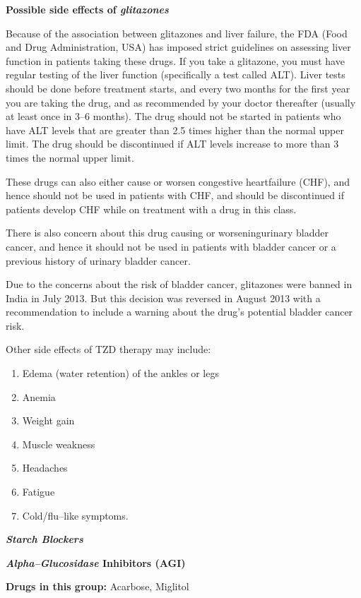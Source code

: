 \noindent\textbf{Possible side effects of \textit{glitazones}}

Because of the association between glitazones and liver failure, the FDA (Food and Drug Administration, USA) has imposed strict guidelines on assessing liver function in patients taking these drugs. If you take a glitazone, you must have regular testing of the liver function (specifically a test called ALT). Liver tests should be done before treatment starts, and every two months for the first year you are taking the drug, and as recommended by your doctor thereafter (usually at least once in 3–6 months). The drug should not be started in patients who have ALT levels that are greater than 2.5 times higher than the normal upper limit. The drug should be discontinued if ALT levels increase to more than 3 times the normal upper limit.

These drugs can also either cause or worsen congestive heart\break failure (CHF), and hence should not be used in patients with CHF, and should be discontinued if patients develop CHF while on treatment with a drug in this class.

There is also concern about this drug causing or worsening\break urinary bladder cancer, and hence it should not be used in patients with bladder cancer or a previous history of urinary bladder cancer.

Due to the concerns about the risk of bladder cancer, glitazones were banned in India in July 2013. But this decision was reversed in August 2013 with a recommendation to include a warning about the drug’s potential bladder cancer risk.

\noindent Other side effects of TZD therapy may include:

\begin{enumerate}[•]
\itemsep=0pt
\item Edema (water retention) of the ankles or legs
\item Anemia
\item Weight gain
\item Muscle weakness
\item Headaches
\item Fatigue
\item Cold/flu–like symptoms.
\end{enumerate}

\textbf{\textit{Starch Blockers}}

\textbf{\textit{Alpha–Glucosidase} Inhibitors (AGI)}

\textbf{Drugs in this group:} Acarbose, Miglitol

